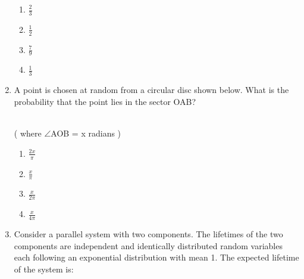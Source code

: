 \begin{enumerate}[label=\thesection.\arabic*.,ref=\thesection.\theenumi]
\begin{enumerate}
    \item $\frac{2}{3}$
    \item $\frac{1}{2}$
    \item $\frac{7}{9}$
    \item $\frac{1}{3}$
\end{enumerate}
%
\solution

%
\newcommand{\tikzAngleOfLine}{\tikz@AngleOfLine}
  \def\tikz@AngleOfLine(#1)(#2)#3{%
  \pgfmathanglebetweenpoints{%
    \pgfpointanchor{#1}{center}}{%
    \pgfpointanchor{#2}{center}}
  \pgfmathsetmacro{#3}{\pgfmathresult}%
  }

\item A point is chosen at random from a circular disc shown below. What is the probability that the point lies in the sector OAB?\\
\\
( where $\angle$AOB = x radians )
\begin{multicols}{2}
    \begin{enumerate}
        \item $\frac{2x}{\pi}$
        \item $\frac{x}{\pi}$
        \item $\frac{x}{2\pi}$
        \item $\frac{x}{4\pi}$
    \end{enumerate}
\end{multicols}
%
\solution

%
\item Consider a parallel system with two components. The lifetimes of the two components are independent and identically distributed random variables each following an exponential distribution with mean 1. The expected lifetime of the system is:

\end{enumerate}
